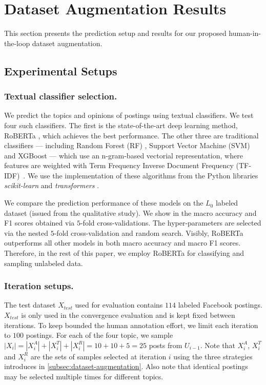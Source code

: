 
\section{Dataset Augmentation Results}
\label{sec:results}
This section presents the prediction setup and results for our proposed human-in-the-loop dataset augmentation.




\subsection{Experimental Setups}

\subsubsection{Textual classifier selection.}
We predict the topics and opinions of postings using textual classifiers.
We test four such classifiers.
The first is the state-of-the-art deep learning method, RoBERTa \citep{vaswani2017attention,liu2019roberta}, which achieves the best performance.
The other three are traditional classifiers --- including Random Forest (RF) \citep{breiman2001random}, Support Vector Machine (SVM) \citep{chang2011libsvm} and XGBoost \citep{xgboost} --- which use an n-gram-based vectorial representation, where features are weighted with Term Frequency Inverse Document Frequency (TF-IDF)~\citep{rajaraman2011mining}.
We use the implementation of these algorithms from the Python libraries \textit{scikit-learn} \citep{scikit-learn} and \textit{transformers} \citep{wolf-etal-2020-transformers}.

We compare the prediction performance of these models on the $L_0$ labeled dataset (issued from the qualitative study).
We show in  the macro accuracy and F1 scores obtained via $5$-fold cross-validations.
The hyper-parameters are selected via the nested $5$-fold cross-validation and random search. 
Visibly, RoBERTa outperforms all other models in both macro accuracy and macro F1 scores. 
Therefore, in the rest of this paper, we employ RoBERTa for classifying and sampling unlabeled data.

\subsubsection{Iteration setups.}
The test dataset $X_{test}$ used for evaluation contains $114$ labeled Facebook postings.
$X_{test}$ is only used in the convergence evaluation and is kept fixed between iterations.
To keep bounded the human annotation effort, we limit each iteration to $100$ postings.
For each of the four topic, we sample $|X_i|=|X_i^{A}| + |X_i^{T}| + |X_i^{R}| = 10 + 10 + 5= 25$ posts from $U_{i-1}$.
Note that $X_i^{A}$, $X_i^{T}$ and $X_i^{R}$ are the sets of samples selected at iteration $i$ using the three strategies introduces in \cref{subsec:dataset-augmentation}.
Also note that identical postings may be selected multiple times for different topics.

